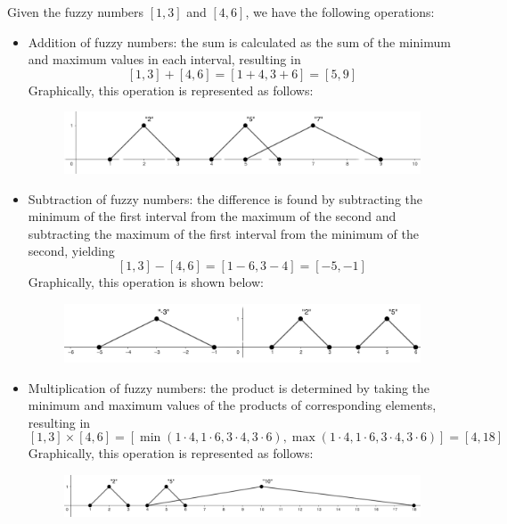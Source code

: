 \documentclass[12pt, a4paper]{report}
\begin{document}
    \begin{example}
        Given the fuzzy numbers $[1,3]$ and $[4,6]$, we have the following operations:
        \begin{itemize}
            \item Addition of fuzzy numbers: the sum is calculated as the sum of the minimum and maximum values in each interval, resulting in 
            \[[1,3] + [4,6] = [1+4, 3+6] = [5,9]\]
            Graphically, this operation is represented as follows:
                \begin{figure}[H]
                    \centering
                    \includegraphics[width=0.75\linewidth]{images/sum.png}
                \end{figure}
            \item Subtraction of fuzzy numbers: the difference is found by subtracting the minimum of the first interval from the maximum of the second and subtracting the maximum of the first interval from the minimum of the second, yielding 
            \[[1,3] - [4,6] = [1-6, 3-4] = [-5,-1]\]
            Graphically, this operation is shown below:
                \begin{figure}[H]
                    \centering
                    \includegraphics[width=0.75\linewidth]{images/subtraction.png}
                \end{figure}
            \item Multiplication of fuzzy numbers: the product is determined by taking the minimum and maximum values of the products of corresponding elements, resulting in 
            \[[1,3] \times [4,6] = [\min(1 \cdot 4, 1 \cdot 6, 3 \cdot 4, 3 \cdot 6), \max(1 \cdot 4, 1 \cdot 6, 3 \cdot 4, 3 \cdot 6)] = [4,18]\]
            Graphically, this operation is represented as follows:
                \begin{figure}[H]
                    \centering
                    \includegraphics[width=0.75\linewidth]{images/multiplication.png}

\end{figure}
\end{itemize}
\end{example}
\end{document}
